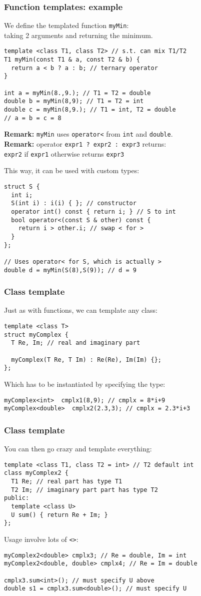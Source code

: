 \documentclass{beamer}
\newcommand{\code}[1]{{\color{cgreen}\texttt{#1}}}
\begin{document}
\begin{frame}
 \frametitle{Function templates: example}
 We define the templated function \code{myMin}: \\
 taking 2 arguments and returning the minimum.
 \begin{lstlisting}
template <class T1, class T2> // s.t. can mix T1/T2
T1 myMin(const T1 & a, const T2 & b) {
  return a < b ? a : b; // ternary operator
}

int a = myMin(8.,9.); // T1 = T2 = double
double b = myMin(8,9); // T1 = T2 = int
double c = myMin(8,9.); // T1 = int, T2 = double
// a = b = c = 8
\end{lstlisting}
\textbf{Remark:} \code{myMin} uses \code{operator<} from \code{int} and \code{double}. \\
\textbf{Remark:} operator \code{expr1 ? expr2 : expr3} returns: \\
\code{expr2} if \code{expr1} otherwise returns \code{expr3}
\framebreak

This way, it can be used with custom types:
 \begin{lstlisting}
struct S {
  int i;
  S(int i) : i(i) { }; // constructor
  operator int() const { return i; } // S to int
  bool operator<(const S & other) const {
    return i > other.i; // swap < for >
  }
};

// Uses operator< for S, which is actually >
double d = myMin(S(8),S(9)); // d = 9
\end{lstlisting}
\end{frame}
 
\begin{frame}[fragile]
 \frametitle{Class template}
 Just as with functions, we can template any class:
 \begin{lstlisting}
template <class T>
struct myComplex {
  T Re, Im; // real and imaginary part
  
  myComplex(T Re, T Im) : Re(Re), Im(Im) {};
};
 \end{lstlisting}
  Which has to be instantiated by specifying the type:
 \begin{lstlisting}
myComplex<int>  cmplx1(8,9); // cmplx = 8*i+9
myComplex<double>  cmplx2(2.3,3); // cmplx = 2.3*i+3
 \end{lstlisting}
\end{frame}

\begin{frame}[fragile]
 \frametitle{Class template}
 You can then go crazy and template everything:
 \begin{lstlisting}
template <class T1, class T2 = int> // T2 default int
class myComplex2 {
  T1 Re; // real part has type T1
  T2 Im; // imaginary part part has type T2
public:
  template <class U>
  U sum() { return Re + Im; }
};
 \end{lstlisting}
 Usage involve lots of \code{<>}:
 \begin{lstlisting}
myComplex2<double> cmplx3; // Re = double, Im = int
myComplex2<double, double> cmplx4; // Re = Im = double

cmplx3.sum<int>(); // must specify U above
double s1 = cmplx3.sum<double>(); // must specify U
 \end{lstlisting}
\end{frame}
 
\end{document}
